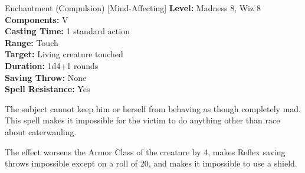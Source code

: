 {Enchantment (Compulsion) [Mind-Affecting]}
{
	\textbf{Level:} Madness 8, Wiz 8\\
	\textbf{Components:} V\\
	\textbf{Casting Time:} 1 standard action\\
	\textbf{Range:} Touch\\
	\textbf{Target:} Living creature touched\\
	\textbf{Duration:} 1d4+1 rounds\\
	\textbf{Saving Throw:} None\\
	\textbf{Spell Resistance:} Yes\\
}
{
	The subject cannot keep him or herself from behaving as though completely mad. This spell makes it impossible for the victim to do anything other than race about caterwauling.

	The effect worsens the Armor Class of the creature by 4, makes Reflex saving throws impossible except on a roll of 20, and makes it impossible to use a shield.
}